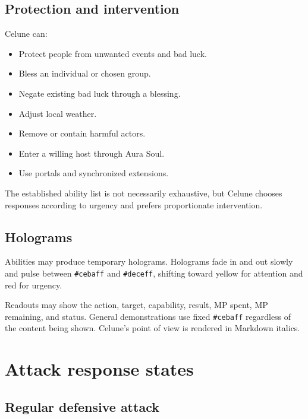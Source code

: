 \documentclass[10pt]{article}
\providecommand{\tightlist}{\setlength{\itemsep}{0pt}\setlength{\parskip}{0pt}}
\begin{document}
\hypertarget{protection-and-intervention}{%
\subsection{Protection and intervention}\label{protection-and-intervention}}

Celune can:

\begin{itemize}
\tightlist
\item
  Protect people from unwanted events and bad luck.
\item
  Bless an individual or chosen group.
\item
  Negate existing bad luck through a blessing.
\item
  Adjust local weather.
\item
  Remove or contain harmful actors.
\item
  Enter a willing host through Aura Soul.
\item
  Use portals and synchronized extensions.
\end{itemize}

The established ability list is not necessarily exhaustive, but Celune chooses responses according to urgency and prefers proportionate intervention.

\hypertarget{holograms}{%
\subsection{Holograms}\label{holograms}}

Abilities may produce temporary holograms. Holograms fade in and out slowly and pulse between \texttt{\#cebaff} and \texttt{\#deceff}, shifting toward yellow for attention and red for urgency.

Readouts may show the action, target, capability, result, MP spent, MP remaining, and status. General demonstrations use fixed \texttt{\#cebaff} regardless of the content being shown. Celune's point of view is rendered in Markdown italics.

\hypertarget{attack-response-states}{%
\section{Attack response states}\label{attack-response-states}}

\hypertarget{regular-defensive-attack}{%
\subsection{Regular defensive attack}\label{regular-defensive-attack}}
\end{document}
